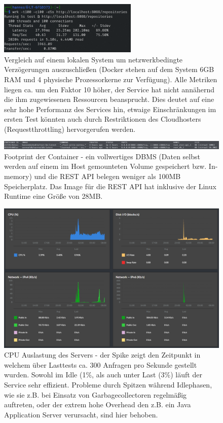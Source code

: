 \documentclass[notitlepage, hidelinks]{article}
\begin{document}
\begin{figure}[H]
\centering
  \includegraphics[width=250px]{images/data5.png}
  \caption{Vergleich auf einem lokalen System um netzwerkbedingte Verzögerungen auszuschließen (Docker stehen auf dem System 6GB RAM und 4 physische Prozessorkerne zur Verfügung). Alle Metriken liegen ca. um den Faktor 10 höher, der Service hat nicht annähernd die ihm zugewiesenen Ressourcen beansprucht. Dies deutet auf eine sehr hohe Performanz des Services hin, etwaige Einschränkungen im ersten Test könnten auch durch Restriktionen des Cloudhosters (Requestthrottling) hervorgerufen werden.  }
  \label{fig:benchmarkfour}
\end{figure}

\begin{figure}[H]
\centering
  \includegraphics[width=\textwidth]{images/data4.png}
  \caption{Footprint der Container - ein vollwertiges DBMS (Daten selbst werden auf einem im Host gemounteten Volume gespeichert bzw. In-memory) und die REST API belegen weniger als 100MB Speicherplatz. Das Image für die REST API hat inklusive der Linux Runtime eine Größe von 28MB.}
  \label{fig:benchmarktwo}
\end{figure}

\begin{figure}[H]
\centering
  \includegraphics[width=\textwidth]{images/data2.png}
  \caption{CPU Auslastung des Servers - der Spike zeigt den Zeitpunkt in welchem über Lasttests ca. 300 Anfragen pro Sekunde gestellt wurden. Sowohl im Idle (1\%, als auch unter Last (3\%) läuft der Service sehr effizient. Probleme durch Spitzen während Idlephasen, wie sie z.B. bei Einsatz von Garbagecollectoren regelmäßig auftreten, oder der extrem hohe Overhead den z.B. ein Java Application Server verursacht, sind hier behoben.}
  \label{fig:benchmarkone}
\end{figure}
\end{document}
